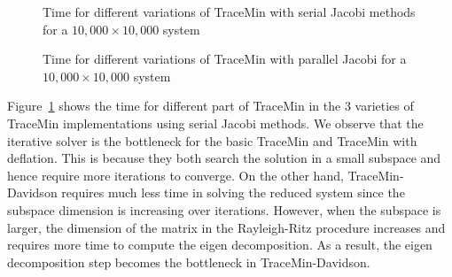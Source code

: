 \begin{figure}[htbp]
	\centering
	\caption{Time for different variations of TraceMin with serial Jacobi methods for a $10,000 \times 10,000$ system}
  \label{fig:comp_s}
\end{figure}

\begin{figure}[htbp]
	\centering
	\caption{Time for different variations of TraceMin with parallel Jacobi for a $10,000 \times 10,000$ system}
  \label{fig:comp_p}
\end{figure}

Figure~\ref{fig:comp_s} shows the time for different part of TraceMin in the 3 varieties of TraceMin implementations
using serial Jacobi methods. We observe that the iterative solver is the bottleneck for the basic TraceMin and
TraceMin with deflation. This is because they both search the solution in a small subspace and hence require more
iterations to converge. On the other hand, TraceMin-Davidson requires much less time in solving the reduced system
since the subspace dimension is increasing over iterations. However, when the subspace is larger, the dimension of
the matrix in the Rayleigh-Ritz procedure increases and requires more time to compute the eigen decomposition. As a
result, the eigen decomposition step becomes the bottleneck in TraceMin-Davidson.

